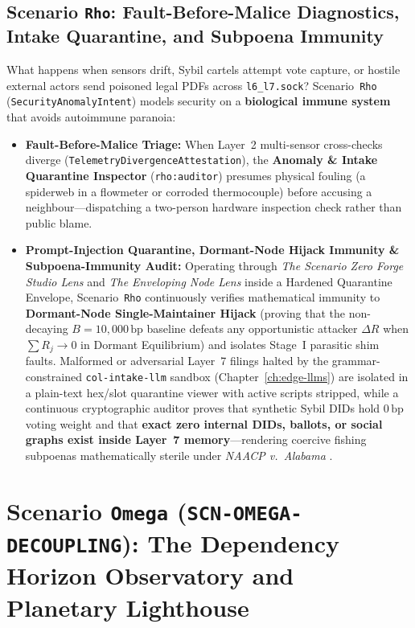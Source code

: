 \subsection{Scenario \texttt{Rho}: Fault-Before-Malice Diagnostics, Intake Quarantine, and Subpoena Immunity}

What happens when sensors drift, Sybil cartels attempt vote capture, or hostile external actors send poisoned legal PDFs across \texttt{l6\_l7.sock}? Scenario~\texttt{Rho} (\texttt{SecurityAnomalyIntent}) models security on a \textbf{biological immune system} that avoids autoimmune paranoia:
\begin{itemize}
    \item \textbf{Fault-Before-Malice Triage:} When Layer~2 multi-sensor cross-checks diverge (\texttt{TelemetryDivergenceAttestation}), the \textbf{Anomaly \& Intake Quarantine Inspector} (\texttt{rho:auditor}) presumes physical fouling (a spiderweb in a flowmeter or corroded thermocouple) before accusing a neighbour---dispatching a two-person hardware inspection check rather than public blame.
    \item \textbf{Prompt-Injection Quarantine, Dormant-Node Hijack Immunity \& Subpoena-Immunity Audit:} Operating through \textit{The Scenario Zero Forge Studio Lens} and \textit{The Enveloping Node Lens} inside a Hardened Quarantine Envelope, Scenario~\texttt{Rho} continuously verifies mathematical immunity to \textbf{Dormant-Node Single-Maintainer Hijack} (proving that the non-decaying $B = 10{,}000\,\mathrm{bp}$ baseline defeats any opportunistic attacker $\Delta R$ when $\sum R_j \to 0$ in Dormant Equilibrium) and isolates Stage~I parasitic shim faults. Malformed or adversarial Layer~7 filings halted by the grammar-constrained \texttt{col-intake-llm} sandbox (Chapter~\ref{ch:edge-llms}) are isolated in a plain-text hex/slot quarantine viewer with active scripts stripped, while a continuous cryptographic auditor proves that synthetic Sybil DIDs hold $0\,\mathrm{bp}$ voting weight and that \textbf{exact zero internal DIDs, ballots, or social graphs exist inside Layer~7 memory}---rendering coercive fishing subpoenas mathematically sterile under \textit{NAACP v.\ Alabama} \parencite{naacp1958}.
\end{itemize}

\section{Scenario \texttt{Omega} (\texttt{SCN-OMEGA-DECOUPLING}): The Dependency Horizon Observatory and Planetary Lighthouse}
\label{sec:wave-f-omega}

